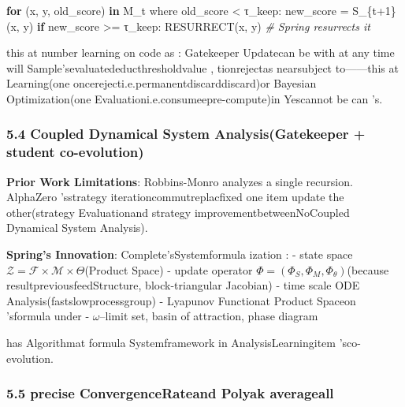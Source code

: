 \documentclass[
  12pt,
]{article}
\newenvironment{Shaded}{}{}
\newcommand{\CommentTok}[1]{\textcolor[rgb]{0.38,0.63,0.69}{\textit{#1}}}
\newcommand{\ControlFlowTok}[1]{\textcolor[rgb]{0.00,0.44,0.13}{\textbf{#1}}}
\newcommand{\DecValTok}[1]{\textcolor[rgb]{0.25,0.63,0.44}{#1}}
\newcommand{\KeywordTok}[1]{\textcolor[rgb]{0.00,0.44,0.13}{\textbf{#1}}}
\newcommand{\NormalTok}[1]{#1}
\newcommand{\OperatorTok}[1]{\textcolor[rgb]{0.40,0.40,0.40}{#1}}
\begin{document}
\begin{Shaded}
\begin{Highlighting}[]
\ControlFlowTok{for}\NormalTok{ (x, y, old\_score) }\KeywordTok{in}\NormalTok{ M\_t where old\_score }\OperatorTok{\textless{}}\NormalTok{ τ\_keep:}
\NormalTok{    new\_score }\OperatorTok{=}\NormalTok{ S\_\{t}\OperatorTok{+}\DecValTok{1}\NormalTok{\}(x, y)}
    \ControlFlowTok{if}\NormalTok{ new\_score }\OperatorTok{\textgreater{}=}\NormalTok{ τ\_keep:}
\NormalTok{        RESURRECT(x, y)  }\CommentTok{\# Spring resurrects it}
\end{Highlighting}
\end{Shaded}

this at number learning on code as : Gatekeeper
Updatecan be with at any time will Sample'sevaluatededucthresholdvalue , tionrejectas nearsubject to------this at Learning(one oncerejecti.e.permanentdiscarddiscard)or Bayesian Optimization(one Evaluationi.e.consumeepre-compute)in Yescannot be can 's. 

\subsubsection{5.4 Coupled Dynamical System Analysis(Gatekeeper +
student co-evolution)}\label{ux8026ux5408ux52a8ux529bux7cfbux7edfux5206ux6790Gatekeeper-ux5b66ux751fux534fux540cux8fdbux5316}

\textbf{Prior Work Limitations}: Robbins-Monro analyzes a single recursion. AlphaZero
'sstrategy iterationcommutreplacfixed one item update the other(strategy Evaluationand strategy improvementbetweenNoCoupled Dynamical System Analysis). 

\textbf{Spring's Innovation}: Complete'sSystemformula ization :  - state space
\(\mathcal{Z} = \mathcal{F} \times \mathcal{M} \times \Theta\)(Product Space)
- update operator
\(\Phi = (\Phi_S, \Phi_M, \Phi_\theta)\)(because resultpreviousfeedStructure, block-triangular
Jacobian) - time scale  ODE Analysis(fastslowprocessgroup) - Lyapunov
Functionat Product Spaceon 'sformula under  - \(\omega\)--limit set, basin of attraction, phase diagram

has Algorithmat formula Systemframework in AnalysisLearningitem 'sco-evolution. 

\subsubsection{5.5 precise ConvergenceRateand  Polyak
averageall }\label{ux7cbeux786eux6536ux655bux901fux7387ux4e0e-polyak-ux5e73ux5747}
\end{document}
